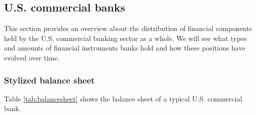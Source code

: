 \documentclass[12pt, a4paper]{article} %
\begin{document}

\subsection{U.S. commercial banks}
\label{sec:AssetLiabs}

This section provides an overview about the distribution of financial components held by the U.S. commercial banking sector as a whole. We will see what types and amounts of financial instruments banks hold and how these positions have evolved over time. 

\subsubsection{Stylized balance sheet}


Table \ref{tab:balancesheet} shows the balance sheet of a typical U.S. commercial bank.
\end{document}
